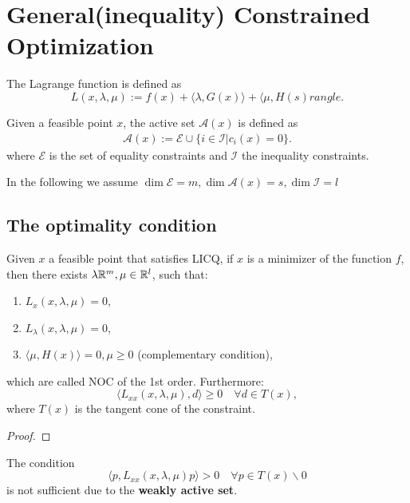 \newpage
\section{General(inequality) Constrained Optimization}
The Lagrange function is defined as 
\begin{equation}
	L(x, \lambda, \mu):= f(x) + \langle \lambda, G(x) \rangle + \langle \mu, H(s) 
	rangle. 
\end{equation}

\begin{definition}
Given a feasible point $x$, the active set $\mathcal{A}(x)$ is defined as 
\begin{align*}
	\mathcal{A}(x):= \mathcal{E} \cup \{i \in \mathcal{I} | c_i(x) = 0\}.
\end{align*}
where $\mathcal{E}$ is the set of equality constraints and $\mathcal{I}$ the inequality constraints. 
\end{definition}
In the following we assume $\dim \mathcal{E} = m, \dim \mathcal{A}(x) = s, \dim \mathcal{I} = l$

\subsection{The optimality condition}
\begin{theorem}
	Given $x$ a feasible point that satisfies LICQ, if $x$ is a minimizer of the function $f$, then there exists $\lambda \mathbb{R}^m, \mu \in \mathbb{R}^l$, such that: 
	\begin{enumerate}
		\item $L_x(x, \lambda, \mu) = 0$,
		\item $L_\lambda(x, \lambda, \mu) = 0$,
		\item $\langle \mu, H(x) \rangle = 0, \mu \ge 0$ (complementary condition),
	\end{enumerate}
	which are called NOC of the 1st order. Furthermore: 
	\begin{equation}
		\langle L_{xx} (x, \lambda, \mu), d \rangle \ge 0 \quad \forall d \in T(x),
	\end{equation}
	where 
	$T(x)$ is the tangent cone of the constraint.  
\end{theorem}
\begin{proof}
\end{proof}
\begin{remark}
The condition 
\[
\langle p, L_{xx} ( x, \lambda, \mu) p \rangle > 0 \quad \forall p \in T(x)\backslash 0
 \]
is not sufficient due to the \textbf{weakly active set}. 
\end{remark}

